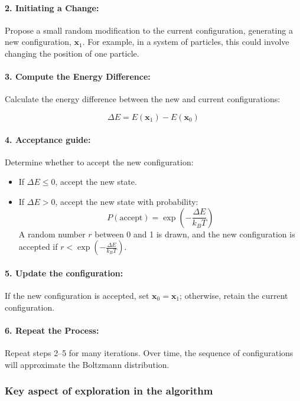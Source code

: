\documentclass[11pt]{article}
\begin{document}
\paragraph*{2. Initiating a Change:}  
Propose a small random modification to the current configuration, generating a new configuration, \(\mathbf{x}_1\). For example, in a system of particles, this could involve changing the position of one particle.

\paragraph*{3. Compute the Energy Difference:}  
Calculate the energy difference between the new and current configurations:

\[
\Delta E = E(\mathbf{x}_1) - E(\mathbf{x}_0)
\]

\paragraph*{4. Acceptance guide:}  
Determine whether to accept the new configuration:
\begin{itemize}
    \item If \(\Delta E \leq 0\), accept the new state.
    \item If \(\Delta E > 0\), accept the new state with probability:
    \[
    P(\text{accept}) = \exp\left(-\frac{\Delta E}{k_B T}\right)
    \]
    A random number \(r\) between 0 and 1 is drawn, and the new configuration is accepted if \(r < \exp\left(-\frac{\Delta E}{k_B T}\right)\).
\end{itemize}

\paragraph*{5. Update the configuration:}  
If the new configuration is accepted, set \(\mathbf{x}_0 = \mathbf{x}_1\); otherwise, retain the current configuration.

\paragraph*{6. Repeat the Process:}  
Repeat steps 2–5 for many iterations. Over time, the sequence of configurations will approximate the Boltzmann distribution.

\subsubsection*{Key aspect of exploration in the algorithm}
\end{document}
